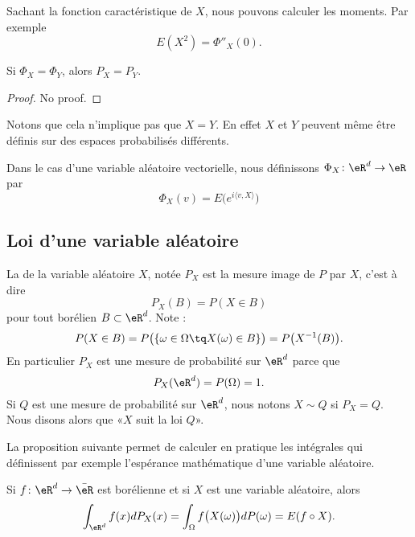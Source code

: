 \begin{example}
    Sachant la fonction caractéristique de \( X\), nous pouvons calculer les moments. Par exemple
    \begin{equation}
        E(X^2)=\Phi''_X(0).
    \end{equation}
\end{example}

\begin{theorem}
    Si \( \Phi_X=\Phi_Y\), alors \( P_X=P_Y\).
\end{theorem}
\begin{proof}
    No proof.
\end{proof}
Notons que cela n'implique pas que \( X=Y\). En effet \( X\) et \( Y\) peuvent même être définis sur des espaces probabilisés différents.

Dans le cas d'une variable aléatoire vectorielle, nous définissons \( \Phi_X\colon \eR^d\to \eR\) par
\begin{equation}
    \Phi_X(v)=E\big(  e^{i\langle v, X\rangle } \big)
\end{equation}
\subsection{Loi d'une variable aléatoire}

La  de la variable aléatoire \( X\), notée \( P_X\) est la mesure image de \( P\) par \( X\), c'est à dire
\begin{equation}
    P_X(B)=P(X\in B)
\end{equation}
pour tout borélien \( B\subset\eR^d\). Note :
\begin{equation}
    P(X\in B)=P\big( \{ \omega\in\Omega\tq X(\omega)\in B \} \big)=P\big( X^{-1}(B) \big).
\end{equation}
En particulier \( P_X\) est une mesure de probabilité sur \( \eR^d\) parce que 
\begin{equation}
    P_X(\eR^d)=P(\Omega)=1.
\end{equation}
Si \( Q\) est une mesure de probabilité sur \( \eR^d\), nous notons \( X\sim Q\) si \( P_X=Q\). Nous disons alors que «\( X\) suit la loi \( Q\)».

La proposition suivante permet de calculer en pratique les intégrales qui définissent par exemple l'espérance mathématique d'une variable aléatoire.
\begin{proposition}     \label{PropintdPintdPXeR}
    Si \( f\colon \eR^d\to \bar\eR\) est borélienne et si \( X\) est une variable aléatoire, alors
    \begin{equation}
        \int_{\eR^d}f(x)dP_X(x)=\int_{\Omega}f\big( X(\omega) \big)dP(\omega)=E(f\circ X).
    \end{equation}
\end{proposition}

